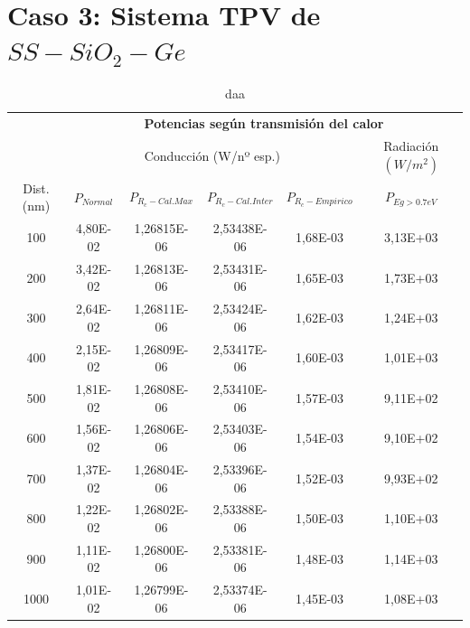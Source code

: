\section{Caso 3: Sistema TPV de $SS-SiO_2-Ge$}
\begin{table}[h]
	\centering
		\begin{tabular}{|c||c|c|c|c||c|}
		\hline
		\multirow{2}{*}{ }& \multicolumn{5}{c|}{\textbf{\large Potencias según transmisión del calor}}\\ \cline{2-6}
& \multicolumn{4}{c||}{Conducción (W/nº esp.)}& Radiación $(W/m^2)$\\ \hline
Dist. (nm)&$P_{Normal}$&$P_{R_c-Cal.Max}$&$P_{R_c-Cal.Inter}$&$P_{R_c-Empirico}$&$P_{Eg>0.7eV}$\\ \hline \hline
100&4,80E-02&1,26815E-06&2,53438E-06&1,68E-03&3,13E+03\\ \hline 
200&3,42E-02&1,26813E-06&2,53431E-06&1,65E-03&1,73E+03\\ \hline 
300&2,64E-02&1,26811E-06&2,53424E-06&1,62E-03&1,24E+03\\ \hline 
400&2,15E-02&1,26809E-06&2,53417E-06&1,60E-03&1,01E+03\\ \hline 
500&1,81E-02&1,26808E-06&2,53410E-06&1,57E-03&9,11E+02\\ \hline 
600&1,56E-02&1,26806E-06&2,53403E-06&1,54E-03&9,10E+02\\ \hline 
700&1,37E-02&1,26804E-06&2,53396E-06&1,52E-03&9,93E+02\\ \hline 
800&1,22E-02&1,26802E-06&2,53388E-06&1,50E-03&1,10E+03\\ \hline 
900&1,11E-02&1,26800E-06&2,53381E-06&1,48E-03&1,14E+03\\ \hline 
1000&1,01E-02&1,26799E-06&2,53374E-06&1,45E-03&1,08E+03\\ \hline 
		\end{tabular}
	\caption{daa}
	\label{tab:daa}
\end{table}

